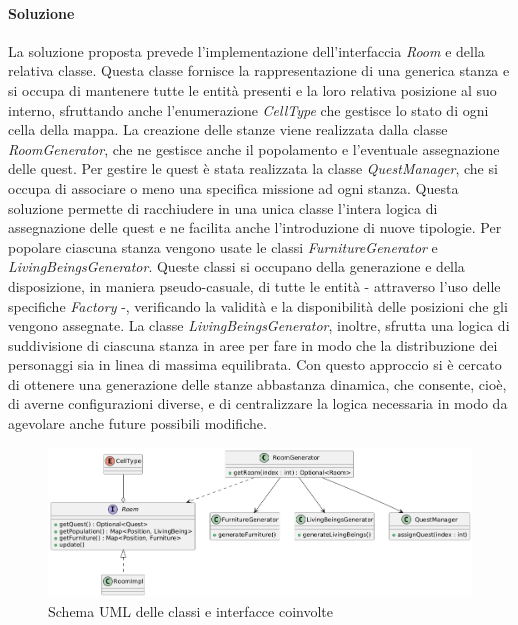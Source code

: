 \documentclass[a4paper,12pt]{report}
\begin{document}
\paragraph{Soluzione} La soluzione proposta prevede l'implementazione dell'interfaccia \textit{Room} e della relativa classe.
Questa classe fornisce la rappresentazione di una generica stanza e si occupa di mantenere tutte le entità presenti e la loro relativa posizione al suo interno, sfruttando anche
l'enumerazione \textit{CellType} che gestisce lo stato di ogni cella della mappa.\newline
La creazione delle stanze viene realizzata dalla classe \textit{RoomGenerator}, che ne gestisce anche il popolamento e l'eventuale assegnazione delle quest.\newline
Per gestire le quest è stata realizzata la classe \textit{QuestManager}, che si occupa di associare o meno una specifica missione ad ogni stanza.
Questa soluzione permette di racchiudere in una unica classe l'intera logica di assegnazione delle quest e ne facilita anche l'introduzione di nuove tipologie.\newline
Per popolare ciascuna stanza vengono usate le classi \textit{FurnitureGenerator} e \textit{LivingBeingsGenerator}.
Queste classi si occupano della generazione e della disposizione, in maniera pseudo-casuale, di tutte le entità - attraverso l'uso delle specifiche \textit{Factory} -, verificando la validità e la disponibilità
delle posizioni che gli vengono assegnate. La classe \textit{LivingBeingsGenerator}, inoltre, sfrutta una logica di suddivisione di ciascuna stanza in aree per fare in modo che la 
distribuzione dei personaggi sia in linea di massima equilibrata.
Con questo approccio si è cercato di ottenere una generazione delle stanze abbastanza dinamica, che consente, cioè, di averne configurazioni diverse, 
e di centralizzare la logica necessaria in modo da agevolare anche future possibili modifiche.\newline

\begin{figure}[H]
	\centering
	\includegraphics[width=\textwidth]{img/RoomUML.png}
	\caption{Schema UML delle classi e interfacce coinvolte}
	\label{img:RoomUML}
\end{figure}
\end{document}
